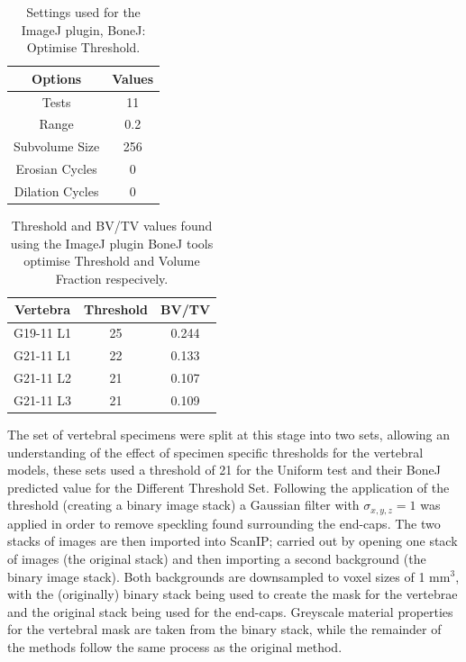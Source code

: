 \begin{table}[ht!]
	\caption{Settings used for the ImageJ plugin, BoneJ: Optimise Threshold.}
	\label{tab:bonej}
	\centering
	\begin{tabular}{c|c}
	Options & Values \\
	\hline
	\hline
	Tests & 11  \\
	Range & 0.2 \\
	Subvolume Size & 256 \\
	Erosian Cycles & 0 \\
	Dilation Cycles & 0 \\
	\hline
	\end{tabular}
\end{table}

\begin{table}[ht!]
	\caption{Threshold and BV/TV values found using the ImageJ plugin BoneJ tools optimise Threshold and Volume Fraction respecively.}
	\label{tab:th_bv_tv}
	\centering
	\begin{tabular}{c|c|c}
		Vertebra & Threshold & BV/TV \\
	\hline
	\hline
	G19-11 L1 & 25 & 0.244\\
	G21-11 L1 & 22 & 0.133\\
	G21-11 L2 & 21 & 0.107\\
	G21-11 L3 & 21 & 0.109\\
	\hline
	\end{tabular}
\end{table}


The set of vertebral specimens were split at this stage into two sets, allowing an understanding of the effect of specimen specific thresholds for the vertebral models, these sets used a threshold of 21 for the Uniform test and their BoneJ predicted value for the Different Threshold Set.
Following the application of the threshold (creating a binary image stack) a Gaussian filter with $ \sigma_{x,y,z} = 1 $ was applied in order to remove speckling found surrounding the end-caps.
The two stacks of images are then imported into ScanIP; carried out by opening one stack of images (the original stack) and then importing a second background (the binary image stack).
Both backgrounds are downsampled to voxel sizes of 1 mm$^3$, with the (originally) binary stack being used to create the mask for the vertebrae and the original stack being used for the end-caps.
Greyscale material properties for the vertebral mask are taken from the binary stack, while the remainder of the methods follow the same process as the original method.

